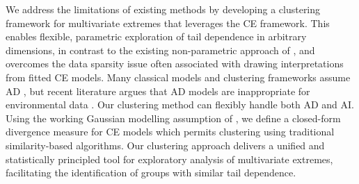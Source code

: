 \documentclass[12pt,compact]{article}
\begin{document}
We address the limitations of existing methods by developing a clustering framework for multivariate extremes that leverages the CE framework. 
This enables flexible, parametric exploration of tail dependence in arbitrary dimensions, in contrast to the existing non-parametric approach of \citet{Vignotto2021}, and overcomes the data sparsity issue often associated with drawing interpretations from fitted CE models.
Many classical models and clustering frameworks assume AD \citep{Vignotto2021,Boulin2025}, but recent literature argues that AD models are inappropriate for environmental data \citep{Opitz2016,Dawkins2018,Huser2024}. 
Our clustering method can flexibly handle both AD and AI. 
Using the working Gaussian modelling assumption of \citet{Heffernan2004}, we define a closed-form divergence measure for CE models which permits clustering using traditional similarity-based algorithms. 
Our clustering approach delivers a unified and statistically principled tool for exploratory analysis of multivariate extremes, facilitating the identification of groups with similar tail dependence. %
\end{document}
